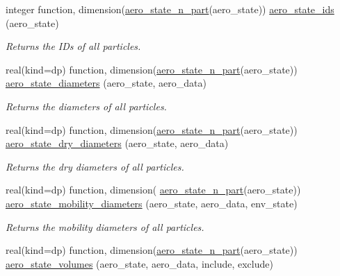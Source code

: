 \begin{DoxyCompactItemize}
integer function, dimension(\mbox{\hyperlink{namespacepmc__aero__state_a94155bf7fa94e7c3ab722a5a1dacac98}{aero\+\_\+state\+\_\+n\+\_\+part}}(aero\+\_\+state)) \mbox{\hyperlink{namespacepmc__aero__state_a4c0671e83504e6bd71735b876c78ec2f}{aero\+\_\+state\+\_\+ids}} (aero\+\_\+state)
\begin{DoxyCompactList}\small\item\em Returns the I\+Ds of all particles. \end{DoxyCompactList}\item 
real(kind=dp) function, dimension(\mbox{\hyperlink{namespacepmc__aero__state_a94155bf7fa94e7c3ab722a5a1dacac98}{aero\+\_\+state\+\_\+n\+\_\+part}}(aero\+\_\+state)) \mbox{\hyperlink{namespacepmc__aero__state_a95c9f58cc1ce505a24fe1cb88eef1918}{aero\+\_\+state\+\_\+diameters}} (aero\+\_\+state, aero\+\_\+data)
\begin{DoxyCompactList}\small\item\em Returns the diameters of all particles. \end{DoxyCompactList}\item 
real(kind=dp) function, dimension(\mbox{\hyperlink{namespacepmc__aero__state_a94155bf7fa94e7c3ab722a5a1dacac98}{aero\+\_\+state\+\_\+n\+\_\+part}}(aero\+\_\+state)) \mbox{\hyperlink{namespacepmc__aero__state_a575abf5653d2e972e8eb66a7a30ab187}{aero\+\_\+state\+\_\+dry\+\_\+diameters}} (aero\+\_\+state, aero\+\_\+data)
\begin{DoxyCompactList}\small\item\em Returns the dry diameters of all particles. \end{DoxyCompactList}\item 
real(kind=dp) function, dimension( \mbox{\hyperlink{namespacepmc__aero__state_a94155bf7fa94e7c3ab722a5a1dacac98}{aero\+\_\+state\+\_\+n\+\_\+part}}(aero\+\_\+state)) \mbox{\hyperlink{namespacepmc__aero__state_a5ddd78918027552f0815529f4c0128fb}{aero\+\_\+state\+\_\+mobility\+\_\+diameters}} (aero\+\_\+state, aero\+\_\+data, env\+\_\+state)
\begin{DoxyCompactList}\small\item\em Returns the mobility diameters of all particles. \end{DoxyCompactList}\item 
real(kind=dp) function, dimension(\mbox{\hyperlink{namespacepmc__aero__state_a94155bf7fa94e7c3ab722a5a1dacac98}{aero\+\_\+state\+\_\+n\+\_\+part}}(aero\+\_\+state)) \mbox{\hyperlink{namespacepmc__aero__state_a94804b9cdd9effc574cfb0cc178f329b}{aero\+\_\+state\+\_\+volumes}} (aero\+\_\+state, aero\+\_\+data, include, exclude)

\end{DoxyCompactItemize}
